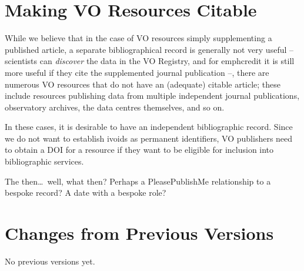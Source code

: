 \documentclass[11pt,a4paper]{ivoa}
\begin{document}
\section{Making VO Resources Citable}

While we believe that in the case of VO resources simply supplementing a
published article, a separate bibliographical record is generally not
very useful -- scientists can \emph{discover} the data in the VO
Registry, and for emph{credit} it is still more useful if they cite the
supplemented journal publication --, there are numerous VO resources
that do not have an (adequate) citable article; these include resources
publishing data from multiple independent journal publications,
observatory archives, the data centres themselves, and so on.

In these cases, it is desirable to have an independent bibliographic
record.  Since we do not want to establish ivoids as permanent
identifiers, VO publishers need to obtain a DOI for a resource if they
want to be eligible for inclusion into bibliographic services.

The then\dots~well, what then?  Perhaps a PleasePublishMe relationship
to a bespoke record?  A date with a bespoke role?

\appendix
\section{Changes from Previous Versions}

No previous versions yet.



\end{document}
